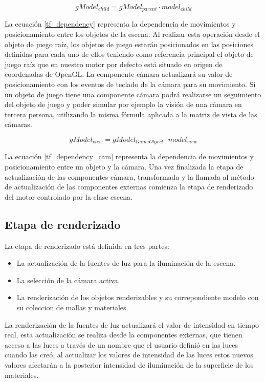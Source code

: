 \documentclass[a4paper]{book}
\begin{document}
\begin{equation} \label{tf_dependency}
gModel_{child} = gModel_{parent} \cdot model_{child}
\end{equation}

La ecuación \ref{tf_dependency} representa la dependencia de movimientos y posicionamiento entre los objetos de la escena. Al realizar esta
operación desde el objeto de juego raíz, los objetos de juego estarán posicionados en las posiciones definidas para
cada uno de ellos teniendo como referencia principal el objeto de juego raíz que en nuestro motor por defecto está situado en origen
de coordenadas de OpenGL. La componente cámara actualizará su valor de posicionamiento con los eventos de teclado de la cámara para
su movimiento. Si un objeto de juego tiene una componente cámara podrá realizarse un seguimiento del objeto de juego y poder simular
por ejemplo la visión de una cámara en tercera persona, utilizando la misma fórmula aplicada a la matriz de vista de las cámaras.

\begin{equation} \label{tf_dependency_cam}
gModel_{view} = gModel_{GameObject} \cdot model_{view}
\end{equation}

La ecuación \ref{tf_dependency_cam} representa la dependencia de movimientos y posicionamiento entre un objeto y la cámara. Una vez finalizada
la etapa de actualización de las componentes cámara, transformada y la llamada al método de actualización
de las componentes externas comienza la etapa de renderizado del motor controlado por la clase escena.

\subsection{Etapa de renderizado}
\label{subsec:renderizado}

La etapa de renderizado está definida en tres partes:

\begin{itemize}
\item La actualización de la fuentes de luz para la iluminación de la escena.
\item La selección de la cámara activa.
\item La renderización de los objetos renderizables y su correpondiente modelo con su coleccion de mallas y materiales.
\end{itemize}

La renderización de la fuentes de luz actualizará el valor de intensidad en tiempo real, esta actualización se realiza desde la
componentes externas, que tienen acceso a las luces a través de un nombre que el usuario definió en las luces cuando las creó, 
al actualizar los valores de intensidad de las luces estos nuevos valores afectarán a la posterior intensidad de iluminación de la 
superficie de los materiales. 
\end{document}
